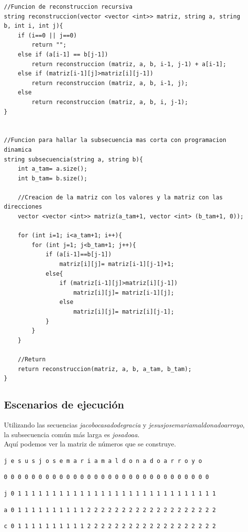\documentclass[11pt,a4paper]{article} %
\begin{document}
\begin{lstlisting}[style=C++]
//Funcion de reconstruccion recursiva
string reconstruccion(vector <vector <int>> matriz, string a, string b, int i, int j){
	if (i==0 || j==0)
		return "";
	else if (a[i-1] == b[j-1])
		return reconstruccion (matriz, a, b, i-1, j-1) + a[i-1];
	else if (matriz[i-1][j]>matriz[i][j-1])
		return reconstruccion (matriz, a, b, i-1, j);
	else
		return reconstruccion (matriz, a, b, i, j-1);
}


//Funcion para hallar la subsecuencia mas corta con programacion dinamica
string subsecuencia(string a, string b){
	int a_tam= a.size();
	int b_tam= b.size();
	
	//Creacion de la matriz con los valores y la matriz con las direcciones
	vector <vector <int>> matriz(a_tam+1, vector <int> (b_tam+1, 0));
	
	for (int i=1; i<a_tam+1; i++){
		for (int j=1; j<b_tam+1; j++){
			if (a[i-1]==b[j-1])
				matriz[i][j]= matriz[i-1][j-1]+1;
			else{
				if (matriz[i-1][j]>matriz[i][j-1])
					matriz[i][j]= matriz[i-1][j];
				else
					matriz[i][j]= matriz[i][j-1];
			}
		}
	}	
	
	//Return
	return reconstruccion(matriz, a, b, a_tam, b_tam);
}
\end{lstlisting}

\newpage
\subsection{Escenarios de ejecución}
Utilizando las secuencias \textit{jacobocasadodegracia} y \textit{jesusjosemariamaldonadoarroyo}, la subsecuencia común más larga es \textit{josadoaa}.\\

Aquí podemos ver la matriz de números que se construye.\\

\small

\hspace{1,72 em} \texttt{j e s u s j o s e m a r i a m a l d o n a d o a r r o y o}

\hspace{0,71 em} \texttt{0 0 0 0 0 0 0 0 0 0 0 0 0 0 0 0 0 0 0 0 0 0 0 0 0 0 0 0 0 0}

\texttt{j 0 1 1 1 1 1 1 1 1 1 1 1 1 1 1 1 1 1 1 1 1 1 1 1 1 1 1 1 1 1}

\texttt{a 0 1 1 1 1 1 1 1 1 1 1 2 2 2 2 2 2 2 2 2 2 2 2 2 2 2 2 2 2 2}

\texttt{c 0 1 1 1 1 1 1 1 1 1 1 2 2 2 2 2 2 2 2 2 2 2 2 2 2 2 2 2 2 2}
\end{document}
